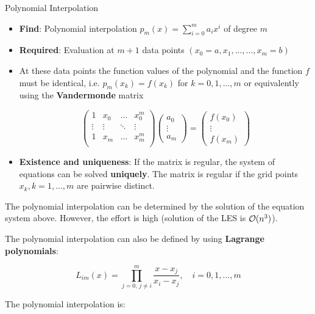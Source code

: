 \documentclass[11pt,compress,t,notes=noshow, xcolor=table]{beamer}
\begin{document}
\begin{vbframe}{Polynomial Interpolation}

\begin{itemize}
\item \textbf{Find}: Polynomial interpolation $p_m(x) = \sum_{i = 0}^m a_i x^i$ of degree $m$
\item \textbf{Required}: Evaluation at $m + 1$ data points $(x_{0} = a, x_1, ..., \ldots, x_{m} = b)$
\item At these data points the function values of the polynomial and the function $f$ must be identical, i.e. $p_m(x_k) = f(x_k)$ for $k = 0, 1, ..., m$ or equivalently using the \textbf{Vandermonde} matrix
\begin{footnotesize}
$$
\begin{pmatrix}
1 & x_0 & \hdots & x_0^m \\
\vdots & \vdots & \ddots & \vdots \\
1 & x_m & \hdots & x_m^m \\
\end{pmatrix}
\begin{pmatrix}
a_0 \\ \vdots \\ a_m
\end{pmatrix}
=
\begin{pmatrix}
f(x_0) \\ \vdots \\ f(x_m)
\end{pmatrix}
$$
\end{footnotesize}

\item \textbf{Existence and uniqueness}: If the matrix is regular, the system of equations can be solved \textbf{uniquely}. The matrix is regular if the grid points $x_k, k = 1, ..., m$ are pairwise distinct.
\end{itemize}


\framebreak

The polynomial interpolation can be determined by the solution of the equation system above. However, the effort is high (solution of the LES is $\mathcal{O}(n^3)$).

\lz

The polynomial interpolation can also be defined by using \textbf{Lagrange polynomials}:

$$
L_{im}(x) = \prod_{j = 0,\, j \not= i}^m \frac{x - x_{j}}{x_{i} - x_{j}}, \quad i = 0, 1, ..., m
$$

The polynomial interpolation is:


\end{vbframe}
\end{document}
